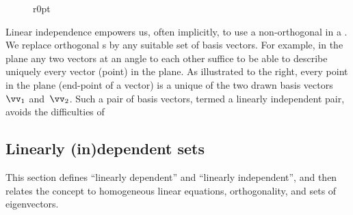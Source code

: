 \begin{figure}r{0pt}
\end{figure}
Linear independence empowers us, often implicitly, to use a non-orthogonal  in a .
We replace orthogonal s by any suitable set of basis vectors.
For example, in the plane any two vectors at an angle to each other suffice to be able to describe uniquely every vector (point) in the plane.
As illustrated to the right, every point in the plane (end-point of a vector) is a unique  of the two drawn basis vectors~\(\vv_1\) and~\(\vv_2\).
Such a pair of basis vectors, termed a linearly independent pair, avoids the  difficulties of 



\subsection{Linearly (in)dependent sets}

This section defines ``linearly dependent'' and ``linearly independent'', and then relates the concept to homogeneous linear equations, orthogonality, and sets of eigenvectors.


